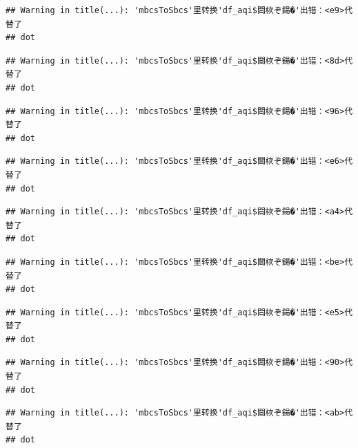 \documentclass[]{book}
\newenvironment{Shaded}{\begin{snugshade}}{\end{snugshade}}
\newcommand{\DataTypeTok}[1]{\textcolor[rgb]{0.13,0.29,0.53}{#1}}
\newcommand{\KeywordTok}[1]{\textcolor[rgb]{0.13,0.29,0.53}{\textbf{#1}}}
\newcommand{\NormalTok}[1]{#1}
\newcommand{\OperatorTok}[1]{\textcolor[rgb]{0.81,0.36,0.00}{\textbf{#1}}}
\newcommand{\StringTok}[1]{\textcolor[rgb]{0.31,0.60,0.02}{#1}}
\begin{document}
\begin{verbatim}
## Warning in title(...): 'mbcsToSbcs'里转换'df_aqi$閸栨ぞ鍚�'出错：<e9>代替了
## dot
\end{verbatim}

\begin{verbatim}
## Warning in title(...): 'mbcsToSbcs'里转换'df_aqi$閸栨ぞ鍚�'出错：<8d>代替了
## dot
\end{verbatim}

\begin{verbatim}
## Warning in title(...): 'mbcsToSbcs'里转换'df_aqi$閸栨ぞ鍚�'出错：<96>代替了
## dot
\end{verbatim}

\begin{verbatim}
## Warning in title(...): 'mbcsToSbcs'里转换'df_aqi$閸栨ぞ鍚�'出错：<e6>代替了
## dot
\end{verbatim}

\begin{verbatim}
## Warning in title(...): 'mbcsToSbcs'里转换'df_aqi$閸栨ぞ鍚�'出错：<a4>代替了
## dot
\end{verbatim}

\begin{verbatim}
## Warning in title(...): 'mbcsToSbcs'里转换'df_aqi$閸栨ぞ鍚�'出错：<be>代替了
## dot
\end{verbatim}

\begin{verbatim}
## Warning in title(...): 'mbcsToSbcs'里转换'df_aqi$閸栨ぞ鍚�'出错：<e5>代替了
## dot
\end{verbatim}

\begin{verbatim}
## Warning in title(...): 'mbcsToSbcs'里转换'df_aqi$閸栨ぞ鍚�'出错：<90>代替了
## dot
\end{verbatim}

\begin{verbatim}
## Warning in title(...): 'mbcsToSbcs'里转换'df_aqi$閸栨ぞ鍚�'出错：<ab>代替了
## dot
\end{verbatim}

\begin{Shaded}
\end{Shaded}
\end{document}
